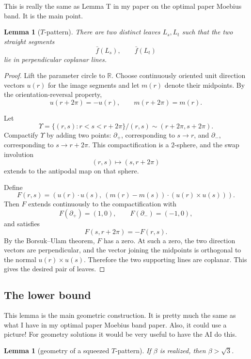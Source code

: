 \documentclass[12pt]{article}
\newtheorem{lemma}[theorem]{Lemma}
\newcommand{\R}{\mathbb R}
\newcommand{\review}[1]{\begin{reviewbox}#1\end{reviewbox}}
\begin{document}
\review{This is really the same as Lemma T in my paper on the optimal paper Moebius band. It is the main point.}



\begin{lemma}[\(T\)-pattern]
There are two distinct leaves \(L_s,L_t\) such that the two straight segments
\[
\bar f(L_s),\qquad \bar f(L_t)
\]
lie in perpendicular coplanar lines.
\end{lemma}

\begin{proof}
Lift the parameter circle to \(\R\).  Choose continuously oriented unit direction vectors \(u(r)\) for the image segments and let \(m(r)\) denote their midpoints.  By the orientation-reversal property,
\[
u(r+2\pi)=-u(r),\qquad m(r+2\pi)=m(r).
\]

Let
\[
\Upsilon=\{(r,s): r<s<r+2\pi\}/(r,s)\sim(r+2\pi,s+2\pi).
\]
Compactify \(\Upsilon\) by adding two points: \(\partial_+\), corresponding to \(s\to r\), and \(\partial_-\), corresponding to \(s\to r+2\pi\).  This compactification is a \(2\)-sphere, and the swap involution
\[
(r,s)\longmapsto (s,r+2\pi)
\]
extends to the antipodal map on that sphere.

Define
\[
F(r,s)=\left(u(r)\cdot u(s),\ (m(r)-m(s))\cdot (u(r)\times u(s))\right).
\]
Then \(F\) extends continuously to the compactification with
\[
F(\partial_+)=(1,0),\qquad F(\partial_-)=(-1,0),
\]
and satisfies
\[
F(s,r+2\pi)=-F(r,s).
\]
By the Borsuk--Ulam theorem, \(F\) has a zero.  At such a zero, the two direction vectors are perpendicular, and the vector joining the midpoints is orthogonal to the normal \(u(r)\times u(s)\).  Therefore the two supporting lines are coplanar.  This gives the desired pair of leaves.
\end{proof}

\subsection{The lower bound}



\review{This lemma is the main geometric construction.  It is pretty much the same as what I have in my optimal paper Moebius band paper. Also, it could use a picture!  For geometry solutions it would be very useful to have the AI do this.}



\begin{lemma}[geometry of a squeezed \(T\)-pattern]
If \(\beta\) is realized, then \(\beta>\sqrt 3\).
\end{lemma}
\end{document}
